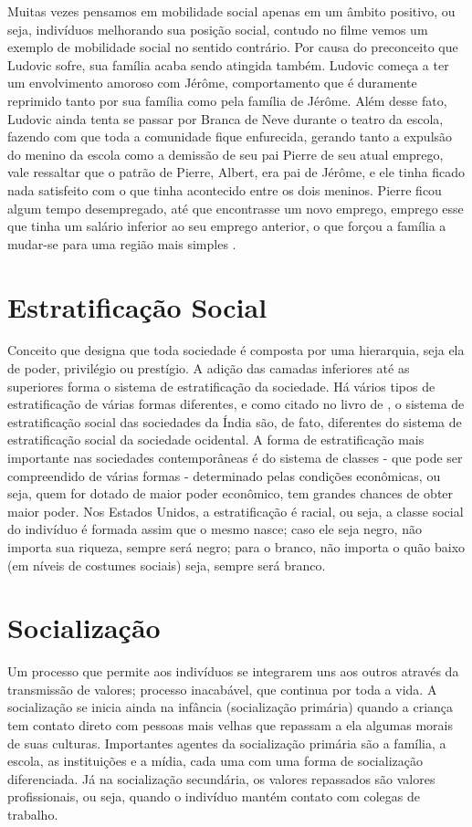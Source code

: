 \documentclass[
	12pt,				%
	openany,
	oneside,			%
	a4paper,			%
	chapter=TITLE,		%
	english,			%
	brazil				%
]{abntex2}
\begin{document}
Muitas vezes pensamos em mobilidade social apenas em um âmbito positivo, ou seja, indivíduos melhorando sua posição social, contudo no filme vemos um exemplo de mobilidade social no sentido contrário. Por causa do preconceito que Ludovic sofre, sua família acaba sendo atingida também. Ludovic começa a ter um envolvimento amoroso com Jérôme, comportamento que é duramente reprimido tanto por sua família como pela família de Jérôme. Além desse fato, Ludovic ainda tenta se passar por Branca de Neve durante o teatro da escola, fazendo com que toda a comunidade fique enfurecida, gerando tanto a expulsão do menino da escola como a demissão de seu pai Pierre de seu atual emprego, vale ressaltar que o patrão de Pierre, Albert, era pai de Jérôme, e ele tinha ficado nada satisfeito com o que tinha acontecido entre os dois meninos. Pierre ficou algum tempo desempregado, até que encontrasse um novo emprego, emprego esse que tinha um salário inferior ao seu emprego anterior, o que forçou a família a mudar-se para uma região mais simples \cite{minhaVidaEmCorDeRosa}.

\chapter{Estratificação Social}
Conceito que designa que toda sociedade é composta por uma hierarquia, seja ela de poder, privilégio ou prestígio. A adição das camadas inferiores até as superiores forma o sistema de estratificação da sociedade. Há vários tipos de estratificação de várias formas diferentes, e como citado no livro de , o sistema de estratificação social das sociedades da Índia são, de fato, diferentes do sistema de estratificação social da sociedade ocidental. A forma de estratificação mais importante nas sociedades contemporâneas é do sistema de classes - que pode ser compreendido de várias formas - determinado pelas condições econômicas, ou seja, quem for dotado de maior poder econômico, tem grandes chances de obter maior poder. Nos Estados Unidos, a estratificação é racial, ou seja, a classe social do indivíduo é formada assim que o mesmo nasce; caso ele seja negro, não importa sua riqueza, sempre será negro; para o branco, não importa o quão baixo (em níveis de costumes sociais) seja, sempre será branco.

\chapter{Socialização}
Um processo que permite aos indivíduos se integrarem uns aos outros através da transmissão de valores; processo inacabável, que continua por toda a vida. A socialização se inicia ainda na infância (socialização primária) quando a criança tem contato direto com pessoas mais velhas que repassam a ela algumas morais de suas culturas. Importantes agentes da socialização primária são a família, a escola, as instituições e a mídia, cada uma com uma forma de socialização diferenciada. Já na socialização secundária, os valores repassados são valores profissionais, ou seja, quando o indivíduo mantém contato com colegas de trabalho.
\end{document}
